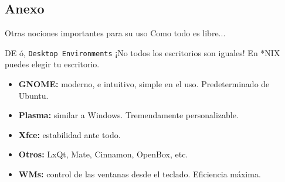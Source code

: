 \documentclass[12pt]{beamer}
\begin{document}
\subsection{Anexo}
\begin{frame}{Otras nociones importantes para su uso}
	Como todo es libre...
	\begin{block}{DE ó, \texttt{Desktop Environments}}
		¡No todos los escritorios son iguales! En *NIX puedes elegir tu escritorio.
		\begin{itemize}
			\item \textbf{GNOME:}  moderno, e intuitivo, simple en el uso. Predeterminado de Ubuntu.
			\item \textbf{Plasma:} similar a Windows. Tremendamente personalizable.
			\item \textbf{Xfce:} estabilidad ante todo.
			\item \textbf{Otros:} LxQt, Mate, Cinnamon, OpenBox, etc.
			\item \textbf{WMs:} control de las ventanas desde el teclado. Eficiencia máxima.
		\end{itemize}
	\end{block}
\end{frame}
\end{document}
